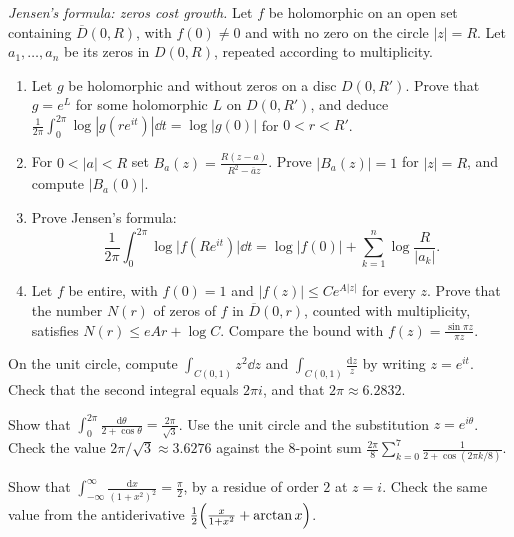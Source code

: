 \begin{exercise}[$\star\star\star$]\label{ex:jensen}
\emph{Jensen's formula: zeros cost growth.} Let $f$ be holomorphic on an open set containing $\overline D(0,R)$, with $f(0)\ne0$ and with no zero on the circle $|z|=R$. Let $a_1,\dots,a_n$ be its zeros in $D(0,R)$, repeated according to multiplicity.
\begin{enumerate}[label=(\alph*)]
\item Let $g$ be holomorphic and without zeros on a disc $D(0,R')$. Prove that $g=e^L$ for some holomorphic $L$ on $D(0,R')$, and deduce $\frac1{2\pi}\int_0^{2\pi}\log|g(re^{it})|\dd t=\log|g(0)|$ for $0<r<R'$.
\item For $0<|a|<R$ set $B_a(z)=\frac{R(z-a)}{R^2-\overline az}$. Prove $|B_a(z)|=1$ for $|z|=R$, and compute $|B_a(0)|$.
\item Prove Jensen's formula:
\[
\frac1{2\pi}\int_0^{2\pi}\log\bigl|f(Re^{it})\bigr|\dd t=\log|f(0)|+\sum_{k=1}^n\log\frac R{|a_k|}.
\]
\item Let $f$ be entire, with $f(0)=1$ and $|f(z)|\le Ce^{A|z|}$ for every $z$. Prove that the number $N(r)$ of zeros of $f$ in $\overline D(0,r)$, counted with multiplicity, satisfies $N(r)\le eAr+\log C$. Compare the bound with $f(z)=\frac{\sin\pi z}{\pi z}$.
\end{enumerate}
\end{exercise}

\begin{exercise}[$\star$]\label{ex:rw09a}
On the unit circle, compute $\int_{C(0,1)}z^2\dd z$ and $\int_{C(0,1)}\frac{\mathrm dz}z$ by writing $z=e^{it}$. Check that the second integral equals $2\pi i$, and that $2\pi\approx6.2832$.
\end{exercise}

\begin{exercise}[$\star\star$]\label{ex:rw09b}
Show that $\displaystyle\int_0^{2\pi}\frac{\mathrm d\theta}{2+\cos\theta}=\frac{2\pi}{\sqrt3}$. Use the unit circle and the substitution $z=e^{i\theta}$. Check the value $2\pi/\sqrt3\approx3.6276$ against the $8$-point sum $\frac{2\pi}8\sum_{k=0}^{7}\frac1{2+\cos(2\pi k/8)}$.
\end{exercise}

\begin{exercise}[$\star\star$]\label{ex:rw09c}
Show that $\displaystyle\int_{-\infty}^\infty\frac{\mathrm dx}{(1+x^2)^2}=\frac\pi2$, by a residue of order $2$ at $z=i$. Check the same value from the antiderivative $\frac12\Bigl(\frac x{1+x^2}+\arctan x\Bigr)$.
\end{exercise}

